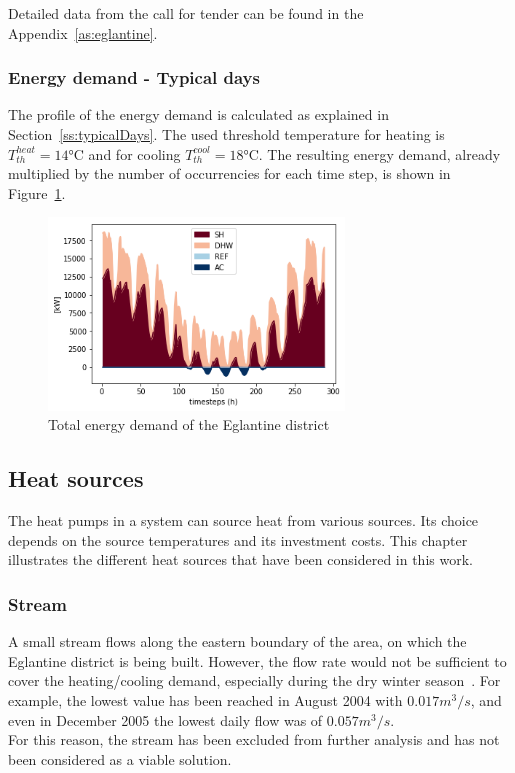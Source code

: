 \documentclass{article}
\begin{document}


Detailed data from the call for tender can be found in the Appendix~\ref{as:eglantine}.

\subsubsection{Energy demand - Typical days}
The profile of the energy demand is calculated as explained in Section~\ref{ss:typicalDays}. The used threshold temperature for heating is $T_{th}^{heat} = 14\si{\celsius}$ and for cooling $T_{th}^{cool} = 18 \si{\celsius}$. The resulting energy demand, already multiplied by the number of occurrencies for each time step, is shown in Figure~\ref{fig:energyDemand}.

\begin{figure}[h!]
	\centering
	\includegraphics[width=0.7\textwidth]{energy_demand.png}
	\caption{Total energy demand of the Eglantine district}
	\label{fig:energyDemand}
\end{figure}


\subsection{Heat sources}
The heat pumps in a system can source heat from various sources. Its choice depends on the source temperatures and its investment costs. This chapter illustrates the different heat sources that have been considered in this work.

\subsubsection{Stream}

A small stream flows along the eastern boundary of the area, on which the Eglantine district is being built. However, the flow rate would not be sufficient to cover the heating/cooling demand, especially during the dry winter season~\cite{veillehydro-meteorologiqueducantondevaudMorgesRiviereDebit}. For example, the lowest value has been reached in August 2004 with $0.017 m^3/s$, and even in December 2005 the lowest daily flow was of $0.057 m^3/s$. \\
For this reason, the stream has been excluded from further analysis and has not been considered as a viable solution.
\end{document}
